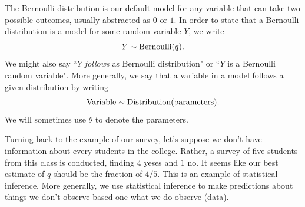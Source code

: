  The Bernoulli distribution is our default model for any variable that can take two possible outcomes, usually abstracted as $0$ or $1$.  In order to state that a Bernoulli distribution is a model for some random variable $Y$, we write
\begin{equation}
Y \sim {\rm Bernoulli}(q).
\end{equation}
We might also say ``$Y$ \emph{follows} as Bernoulli distribution" or ``$Y$ is a Bernoulli random variable".
More generally, we say that a variable in a model follows a given distribution by writing
\begin{equation}
{\rm Variable} \sim {\rm Distribution}({\rm parameters}).
\end{equation}
We will sometimes use $\theta$ to denote the parameters. 


Turning back to the example of our survey, let's suppose we don't have information about every students in the college. Rather, a survey of five students from this class is conducted, finding $4$ yeses and $1$ no. It seems like our best estimate of $q$ should be the fraction of $4/5$. This is an example of {\dfn statistical inference}. More generally, we use statistical inference to make predictions about things we don't observe based one what we do observe (data).





